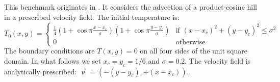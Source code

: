 This benchmark originates in \cite{dohu03}. It considers the advection of a product-cosine hill
in a prescribed velocity field. The initial temperature is:
\begin{equation}
T_0(x,y)=
\left\{
\begin{array}{cc}
\frac{1}{4}
\left(1+\cos \pi\frac{x-x_c}{\sigma}\right)
\left(1+\cos \pi\frac{y-y_c}{\sigma}\right)
& \text{if } (x-x_c)^2+(y-y_c)^2\leq \sigma^2 \\
0 & \text{otherwise}
\end{array}
\right.
\end{equation}
The boundary conditions are $T(x,y)=0$ on all four sides of the unit square domain. In what follows we set $x_c=y_c=1/6$ and $\sigma=0.2$.  The velocity field is analytically prescribed: $\vec\upnu=(-(y-y_c),+(x-x_c))$.

